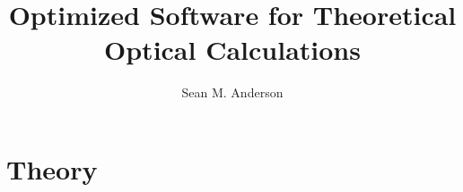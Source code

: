 \documentclass{book}
\title{Optimized Software for Theoretical Optical Calculations}
\author{Sean M. Anderson}
\begin{document}
\frontmatter
\maketitle
\tableofcontents

\mainmatter
\chapter{Theory}\label{ch:theory}


\appendix
%
%
%
%
%
%
%
%



\end{document}
